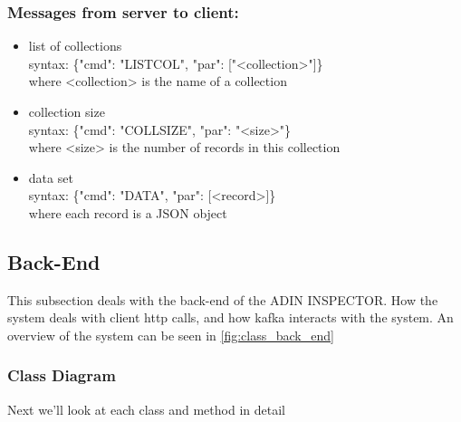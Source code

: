 \documentclass[oneside, english, final]{design}
\begin{document}
\subsubsection{Messages from server to client:}
\begin{itemize}
\item{list of collections}
\\
syntax: \{"cmd": "LISTCOL", "par": ["<collection>"]\} \\
where <collection> is the name of a collection\\

\item{collection size}
\\
syntax: \{"cmd": "COLLSIZE", "par": "<size>"\} \\
where <size> is the number of records in this collection\\
\item{data set}
\\
syntax: \{"cmd": "DATA", "par": [<record>]\} \\
where each record is a JSON object
\end{itemize}

\subsection{Back-End}
This subsection deals with the back-end of the ADIN INSPECTOR. How the system deals with client http calls, and how kafka interacts with the system.
An overview of the system can be seen in \autoref{fig:class_back_end}

\subsubsection{Class Diagram}
Next we'll look at each class and method in detail
\end{document}

